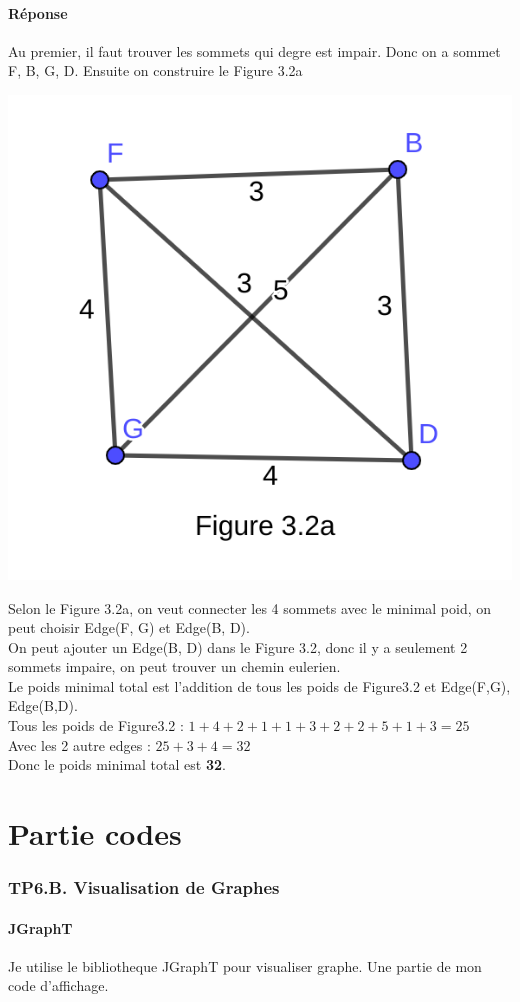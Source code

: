 \documentclass[12pt]{fphw}
\begin{document}
\subsection*{Réponse}Au premier, il faut trouver les sommets qui degre est impair. Donc on a sommet F, B, G, D. Ensuite on construire le Figure 3.2a\\

\begin{center}
	\includegraphics[width=0.5\columnwidth]{Figure3.2a.png} %
\end{center}

Selon le Figure 3.2a, on veut connecter les 4 sommets avec le minimal poid, on peut choisir Edge(F, G) et Edge(B, D).\\

On peut ajouter un Edge(B, D) dans le Figure 3.2, donc il y a seulement 2 sommets impaire, on peut trouver un chemin eulerien.\\

Le poids minimal total est l'addition de tous les poids de Figure3.2 et Edge(F,G), Edge(B,D).\\

Tous les poids de Figure3.2 : \(1+4+2+1+1+3+2+2+5+1+3 = 25\)\\
Avec les 2 autre edges : \(25 + 3 + 4 = 32\)\\

Donc le poids minimal total est \textbf{32}.

\newpage
\part*{Partie codes}

\section*{TP6.B. Visualisation de Graphes}
\subsection*{JGraphT}
Je utilise le bibliotheque JGraphT pour visualiser graphe. Une partie de mon code d'affichage.
\end{document}
